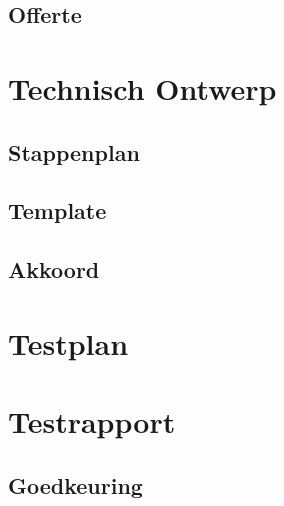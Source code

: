 \documentclass[a4paper,12pt,twoside,openright,titlepage]{book}
\begin{document}
\section{Offerte}


\chapter{Technisch Ontwerp}

\section{Stappenplan}

\section{Template}

\section{Akkoord}


\chapter{Testplan}

\chapter{Testrapport}
\section{Goedkeuring}



\backmatter
\printindex
\end{document}
